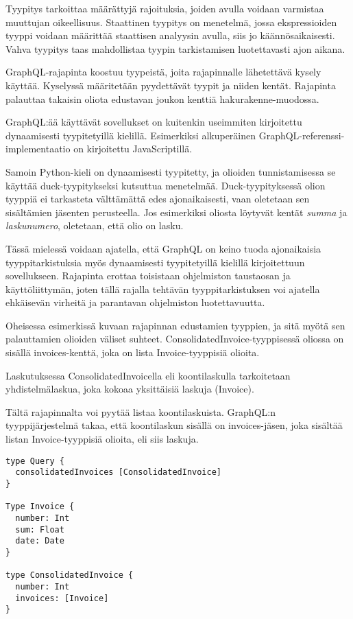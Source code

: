 Tyypitys tarkoittaa määrättyjä rajoituksia, joiden avulla voidaan
varmistaa muuttujan oikeellisuus. Staattinen tyypitys on menetelmä,
jossa ekspressioiden tyyppi voidaan määrittää staattisen analyysin
avulla, siis jo käännösaikaisesti. Vahva tyypitys taas mahdollistaa
tyypin tarkistamisen luotettavasti ajon aikana.
\cite{Cardelli+Wegner:1985}

GraphQL-rajapinta koostuu tyypeistä, joita rajapinnalle lähetettävä
kysely käyttää. Kyselyssä määritetään pyydettävät tyypit ja niiden
kentät. Rajapinta palauttaa takaisin oliota edustavan joukon kenttiä
\gls{hakurakenne}-muodossa. \cite{graphql:spec}

GraphQL:ää käyttävät sovellukset on kuitenkin useimmiten kirjoitettu
dynaamisesti tyypitetyillä kielillä. Esimerkiksi alkuperäinen
GraphQL-referenssi-implementaatio on kirjoitettu
JavaScriptillä.\cite{graphqlRefImple2021Oct}

Samoin Python-kieli on dynaamisesti tyypitetty, ja olioiden
tunnistamisessa se käyttää duck-tyypitykseksi kutsuttua menetelmää.
Duck-tyypityksessä olion tyyppiä ei tarkasteta välttämättä edes
ajonaikaisesti, vaan oletetaan sen sisältämien jäsenten
perusteella.\cite{pythonGloss2021Oct} Jos esimerkiksi oliosta löytyvät
kentät \emph{summa} ja \emph{laskunumero}, oletetaan, että olio on
lasku.

Tässä mielessä voidaan ajatella, että GraphQL on keino tuoda
ajonaikaisia tyyppitarkistuksia myös dynaamisesti tyypitetyillä kielillä
kirjoitettuun sovellukseen. Rajapinta erottaa toisistaan ohjelmiston
taustaosan ja käyttöliittymän, joten tällä rajalla tehtävän
tyyppitarkistuksen voi ajatella ehkäisevän virheitä ja parantavan
ohjelmiston luotettavuutta.

Oheisessa esimerkissä kuvaan rajapinnan edustamien tyyppien, ja sitä
myötä sen palauttamien olioiden väliset suhteet.
ConsolidatedInvoice-tyyppisessä oliossa on sisällä invoices-kenttä, joka
on lista Invoice-tyyppisiä olioita.

Laskutuksessa ConsolidatedInvoicella eli koontilaskulla tarkoitetaan
yhdistelmälaskua, joka kokoaa yksittäisiä laskuja (Invoice).

Tältä rajapinnalta voi pyytää listaa koontilaskuista. GraphQL:n
tyyppijärjestelmä takaa, että koontilaskun sisällä on invoices-jäsen,
joka sisältää listan Invoice-tyyppisiä olioita, eli siis laskuja.

\begin{verbatim}
type Query {
  consolidatedInvoices [ConsolidatedInvoice]
}

Type Invoice {
  number: Int
  sum: Float
  date: Date
}

type ConsolidatedInvoice {
  number: Int
  invoices: [Invoice]
}
\end{verbatim}

